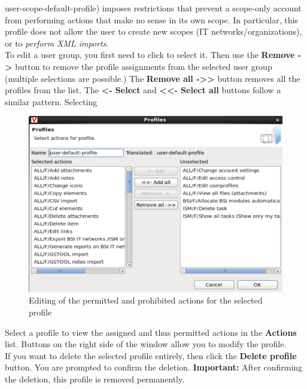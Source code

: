 \documentclass[a4paper,10pt]{book}
\begin{document}
user-scope-default-profile) imposes restrictions that prevent a scope-only account from performing actions
that make no sense in its own scope. In particular, this profile does not allow the user to create new scopes
(IT networks/organizations), or to {\em perform XML imports}.
\newline\\
To edit a user group, you first need to click to select it. Then use the \textbf{Remove -\textgreater} button
to remove the profile assignments from the selected user group (multiple selections are possible.) The
\textbf{Remove all -\textgreater\textgreater} button removes all the profiles from the list. The
\textbf{\textless- Select} and \textbf{\textless\textless- Select all} buttons follow a similar pattern.
Selecting \newline
\begin{figure}[htb!]
  \centering
  \includegraphics[scale=.60]{Screenshot/Berechtigungsprofil_bearbeiten-en.png}
  \caption{\label{Editing of the permitted and prohibited actions for the selected profile} Editing of the permitted and prohibited actions for the selected profile}
\end{figure}
\newline
Select a profile to view the assigned and thus permitted actions in the \textbf{Actions} list. Buttons on
the right side of the window allow you to modify the profile.
\newline\\
If you want to delete the selected profile entirely, then click the \textbf{Delete profile} button.
You are prompted to confirm the deletion. \textbf{Important:} After confirming the deletion, this profile is removed permanently.
\end{document}

